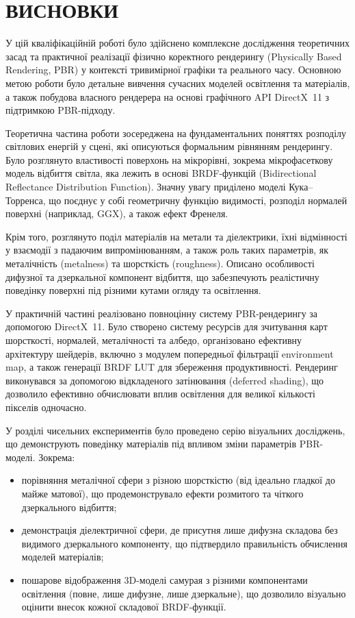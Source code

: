 \chapter*{ВИСНОВКИ}
\par У цій кваліфікаційній роботі було здійснено комплексне дослідження тео\-ре\-тич\-них засад та практичної реалізації фізично коректного рендерингу (Phy\-si\-cal\-ly Based Rendering, PBR) у контексті тривимірної графіки та реального часу. Ос\-нов\-ною метою роботи було детальне вивчення сучасних моделей ос\-віт\-лен\-ня та матеріалів, а також побудова власного рендерера на основі графічного API DirectX~11 з підтримкою PBR-підходу.

\par Теоретична частина роботи зосереджена на фундаментальних поняттях розподілу світлових енергій у сцені, які описуються формальним рівнянням рендерингу. Було розглянуто властивості поверхонь на мікрорівні, зокрема мікрофасеткову модель відбиття світла, яка лежить в основі BRDF-функцій (Bi\-di\-rec\-tio\-nal Reflectance Distribution Function). Значну увагу приділено моделі Кука–Тор\-рен\-са, що поєднує у собі геометричну функцію видимості, розподіл нормалей поверхні (наприклад, GGX), а також ефект Френеля.

\par Крім того, розглянуто поділ матеріалів на метали та діелектрики, їхні відмінності у взаємодії з падаючим випромінюванням, а також роль таких параметрів, як металічність (metalness) та шорсткість (roughness). Описано особ\-ли\-вос\-ті дифузної  та дзеркальної  компонент відбиття, що забезпечують реаліс\-тич\-ну поведінку поверхні під різними кутами огляду та освітлення. 

\par У практичній частині реалізовано повноцінну систему PBR-рендерингу за допомогою DirectX~11. Було створено систему ресурсів для зчитування карт шорсткості, нормалей, металічності та албедо, організовано ефективну архі\-тек\-ту\-ру шейдерів, включно з модулем попередньої фільтрації environment map, а також генерації BRDF LUT для збереження продуктивності. Рендеринг виконувався за допомогою відкладеного затінювання (deferred shading), що дозволило ефективно обчислювати вплив освітлення для великої кількості пікселів одночасно.

\par У розділі чисельних експериментів було проведено серію візуальних досліджень, що демонструють поведінку матеріалів під впливом зміни параметрів PBR-моделі. Зокрема:
\begin{itemize}
    \item порівняння металічної сфери з різною шорсткістю (від ідеально гладкої до майже матової), що продемонструвало ефекти розмитого та чіт\-ко\-го дзеркального відбиття;
    \item демонстрація діелектричної сфери, де присутня лише дифузна складова без видимого дзеркального компоненту, що підтвердило правильність обчислення моделей матеріалів;
    \item пошарове відображення 3D-моделі самурая з різними компонентами освітлення (повне, лише дифузне, лише дзеркальне), що дозволило візуально оцінити внесок кожної складової BRDF-функції.
\end{itemize}

